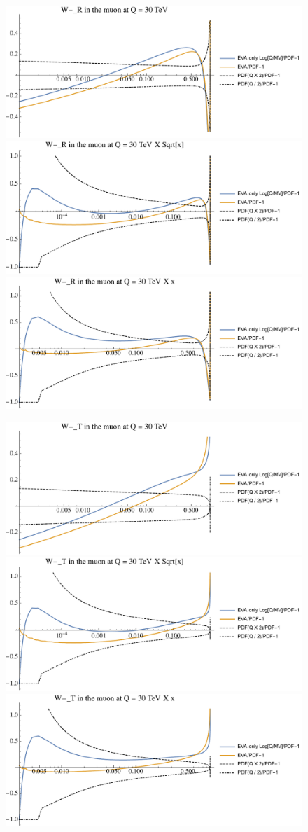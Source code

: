 \documentclass[a4paper,11pt]{article}
\begin{document}
\begin{figure}[ht]
\includegraphics[width=0.46\linewidth]{PlotPDFs/ratios/30TeV/W-_R_Q.pdf}
\includegraphics[width=0.46\linewidth]{PlotPDFs/ratios/30TeV/W-_R_Qsqrtx.pdf}
\includegraphics[width=0.46\linewidth]{PlotPDFs/ratios/30TeV/W-_R_Qx.pdf}
\end{figure}


\begin{figure}[ht]
\includegraphics[width=0.46\linewidth]{PlotPDFs/ratios/30TeV/W-_T_Q.pdf}
\includegraphics[width=0.46\linewidth]{PlotPDFs/ratios/30TeV/W-_T_Qsqrtx.pdf}
\includegraphics[width=0.46\linewidth]{PlotPDFs/ratios/30TeV/W-_T_Qx.pdf}
\end{figure}
\end{document}

